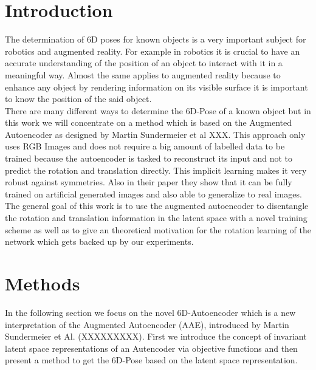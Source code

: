 \documentclass[10pt,a4paper]{article}
\begin{document}
\section{Introduction}\label{Introduction}
The determination of 6D poses for known objects is a very important subject for robotics and augmented reality. For example in robotics it is crucial to have an accurate understanding of the position of an object to interact with it in a meaningful way. Almost the same applies to augmented reality because to enhance any object by rendering information on its visible surface it is important to know the position of the said object.\\
There are many different ways to determine the 6D-Pose of a known object but in this work we will concentrate on a method which is based on the Augmented Autoencoder as designed by Martin Sundermeier et al XXX. This approach only uses RGB Images and does not require a big amount of labelled data to be trained because the autoencoder is tasked to reconstruct its input and not to predict the rotation and translation directly. This implicit learning makes it very robust against symmetries. Also in their paper they show that it can be fully trained on artificial generated images and also able to generalize to real images.\\
The general goal of this work is to use the augmented autoencoder to disentangle the rotation and translation information in the latent space with a novel training scheme as well as to give an theoretical motivation for the rotation learning of the network which gets backed up by our experiments.\\



\newpage

\section{Methods}\label{Methods}
In the following section we focus on the novel 6D-Autoencoder which is a new interpretation of the Augmented Autoencoder (AAE), introduced by Martin Sundermeier et Al. (XXXXXXXXX). First we introduce the concept of invariant latent space representations of an Autencoder via objective functions and then present a method to get the 6D-Pose based on the latent space representation.
\end{document}
